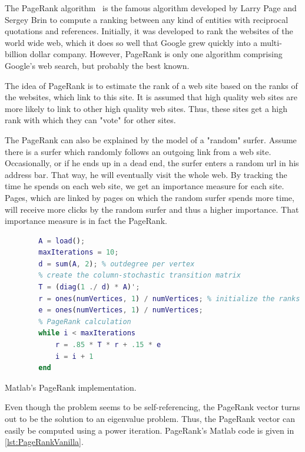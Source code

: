 The PageRank algorithm~\cite{page:1999a} is the famous algorithm developed by Larry Page and Sergey Brin to compute a ranking between any kind of entities with reciprocal quotations and references.
Initially, it was developed to rank the websites of the world wide web, which it does so well that Google grew quickly into a multi-billion dollar company.
However, PageRank is only one algorithm comprising Google's web search, but probably the best known.

The idea of PageRank is to estimate the rank of a web site based on the ranks of the websites, which link to this site.
It is assumed that high quality web sites are more likely to link to other high quality web sites.
Thus, these sites get a high rank with which they can "vote" for other sites.

The PageRank can also be explained by the model of a "random" surfer.
Assume there is a surfer which randomly follows an outgoing link from a web site.
Occasionally, or if he ends up in a dead end, the surfer enters a random url in his address bar.
That way, he will eventually visit the whole web.
By tracking the time he spends on each web site, we get an importance measure for each site.
Pages, which are linked by pages on which the random surfer spends more time, will receive more clicks by the random surfer and thus a higher importance.
That importance measure is in fact the PageRank.

\begin{listing}[!h]
	\begin{CenteredBox}
		\begin{lstlisting}[language=Matlab]
		% load adjacency matrix
		A = load(); 
		maxIterations = 10;
		d = sum(A, 2); % outdegree per vertex
		% create the column-stochastic transition matrix
		T = (diag(1 ./ d) * A)'; 
		r = ones(numVertices, 1) / numVertices; % initialize the ranks
		e = ones(numVertices, 1) / numVertices;
		% PageRank calculation
		while i < maxIterations
			r = .85 * T * r + .15 * e
			i = i + 1
		end
		\end{lstlisting}
	\end{CenteredBox}
	\caption{Matlab's PageRank implementation.}
	\label{lst:PageRankVanilla}
\end{listing}

Even though the problem seems to be self-referencing, the PageRank vector turns out to be the solution to an eigenvalue problem.
Thus, the PageRank vector can easily be computed using a power iteration.
PageRank's Matlab code is given in \cref{lst:PageRankVanilla}.

